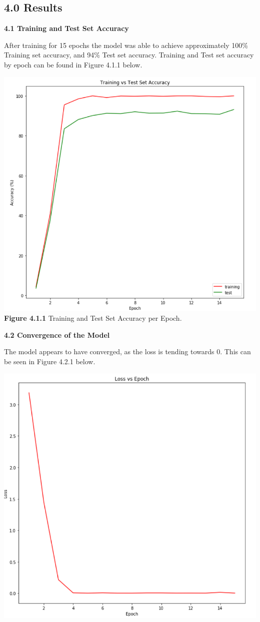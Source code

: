 \documentclass[11pt]{article}
\begin{document}
\begin{multicols}{2}
\subsection*{4.0 Results}
\textbf{4.1 Training and Test Set Accuracy}
\par
After training for 15 epochs the model was able to achieve approximately 100\% Training set accuracy, and 94\% Test set accuracy.  Training and Test set accuracy by epoch can be found in Figure 4.1.1 below.
\begin{center}
\includegraphics[scale=.5]{TrainingTest}
\textbf{Figure 4.1.1} Training and Test Set Accuracy per Epoch.
\end{center}
\textbf{4.2 Convergence of the Model}
\par
The model appears to have converged, as the loss is tending towards 0.  This can be seen in Figure 4.2.1 below.
\begin{center}
\includegraphics[scale=.5]{LossEpoch}

\end{center}
\end{multicols}
\end{document}
